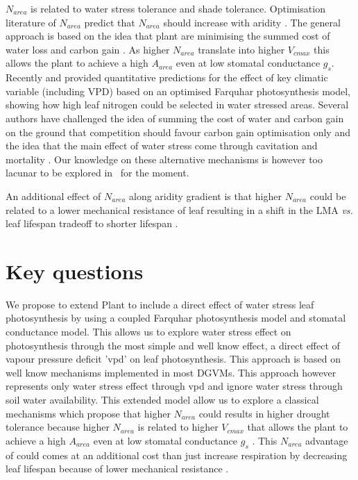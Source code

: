 \documentclass[a4paper,11pt]{article}
\begin{document}
$N_{area}$ is related to water stress tolerance and shade tolerance. Optimisation literature of $N_{area}$ predict that $N_{area}$ should
increase with aridity \citep{Wright-2003}. The general approach is
based on the idea that plant are minimising the summed cost of water
loss and carbon gain
\citep{Medlyn-2002,Wright-2003,Prentice-2014,Lu-2016,Wang-2017,Dong-2017}. As
higher $N_{area}$ translate into higher $V_{cmax}$ this allows the
plant to achieve a high $A_{area}$ even at low stomatal conductance
$g_s$. Recently \citet{Prentice-2014} and \citet{Dong-2017} provided
quantitative predictions for the effect of key climatic variable
(including VPD) based on an optimised Farquhar photosynthesis
model, showing how high leaf nitrogen could be selected in water stressed areas. Several authors have challenged the idea of summing the cost of
water and carbon gain on the ground that competition should favour
carbon gain optimisation only \citep{Wolf-2016} and the idea that the
main effect of water stress come through cavitation and mortality \citep{Sperry-2016,Sperry-2017}. Our knowledge on these alternative mechanisms is however too lacunar to be explored in \plant\ for the moment.

An additional effect of $N_{area}$ along aridity gradient is that higher $N_{area}$ could be related to a lower mechanical resistance of leaf resulting in a shift in the LMA \textit{vs.} leaf lifespan tradeoff to shorter lifespan \citep{Wright-2002a}.



\section{Key questions}

We propose to extend Plant to include a direct effect of water stress leaf photosynthesis by using a coupled Farquhar photosynthesis model and stomatal conductance model. This allows us to explore water stress effect on photosynthesis through the most simple and well know effect, a direct effect of vapour pressure deficit 'vpd' on leaf photosynthesis. This approach
  is based on well know mechanisms implemented in most DGVMs. This approach however represents only water stress effect through vpd and ignore water stress through soil water availability. This extended model allow us to explore a classical mechanisms which propose that higher $N_{area}$ could results in higher drought tolerance because higher $N_{area}$ is related to higher $V_{cmax}$ that allows the
plant to achieve a high $A_{area}$ even at low stomatal conductance
$g_s$ \citep{Wright-2003}. This $N_{area}$ advantage of could comes at an additional cost than just increase respiration by decreasing leaf lifespan because of lower mechanical resistance \citep{Wright-2002a}.  
\end{document}
